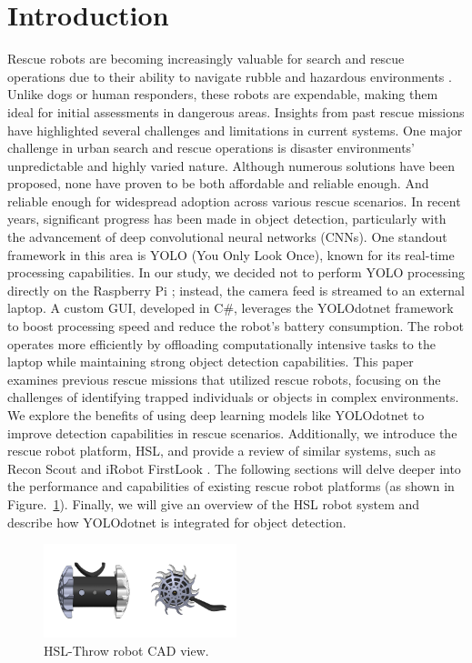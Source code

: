 \documentclass[conference]{IEEEtran}
\begin{document}
\section{Introduction}
Rescue robots are becoming increasingly valuable for search and rescue operations due to their ability to navigate rubble and hazardous environments \cite{Messina2007}. Unlike dogs or human responders, these robots are expendable, making them ideal for initial assessments in dangerous areas. Insights from past rescue missions have highlighted several challenges and limitations in current systems. One major challenge in urban search and rescue operations is disaster environments' unpredictable and highly varied nature. Although numerous solutions have been proposed, none have proven to be both affordable and reliable enough. And reliable enough for widespread adoption across various rescue scenarios. In recent years, significant progress has been made in object detection, particularly with the advancement of deep convolutional neural networks (CNNs). One standout framework in this area is YOLO (You Only Look Once), known for its real-time processing capabilities. In our study, we decided not to perform YOLO processing directly on the Raspberry Pi \cite{Yao2022}; instead, the camera feed is streamed to an external laptop. A custom GUI, developed in C\#, leverages the YOLOdotnet framework to boost processing speed and reduce the robot's battery consumption. The robot operates more efficiently by offloading computationally intensive tasks to the laptop while maintaining strong object detection capabilities. This paper examines previous rescue missions that utilized rescue robots, focusing on the challenges of identifying trapped individuals or objects in complex environments. We explore the benefits of using deep learning models like YOLOdotnet to improve detection capabilities in rescue scenarios.
Additionally, we introduce the rescue robot platform, HSL, and provide a review of similar systems, such as Recon Scout and iRobot FirstLook \cite{ReconRobotics_ScoutXL, ReconRobotics_ThrowbotXT}. The following sections will delve deeper into the performance and capabilities of existing rescue robot platforms (as shown in Figure.~\ref{fig_First}). Finally, we will give an overview of the HSL robot system and describe how YOLOdotnet is integrated for object detection.

\begin{figure}[htbp]
\centerline{\includegraphics[width=0.5\textwidth]{Fig_First.PNG}}
\caption{HSL-Throw robot CAD view.}
\label{fig_First}
\end{figure}
\end{document}
